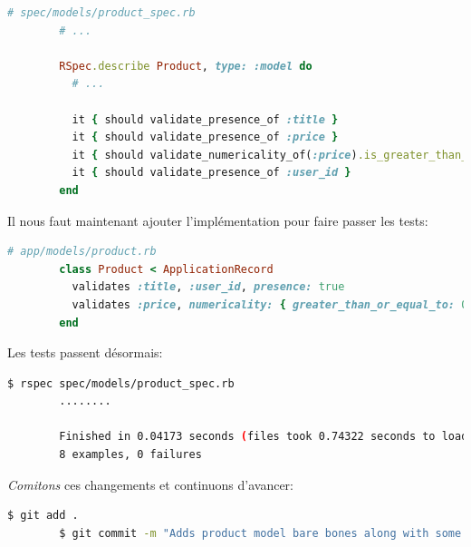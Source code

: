 \documentclass[]{report}
\begin{document}
      \begin{scriptsize}
        \begin{lstlisting}[language=ruby, caption={Ajout de tests de présences pour les produits}, label={lst:add_presence_to_product_test}]
        # spec/models/product_spec.rb
        # ...

        RSpec.describe Product, type: :model do
          # ...

          it { should validate_presence_of :title }
          it { should validate_presence_of :price }
          it { should validate_numericality_of(:price).is_greater_than_or_equal_to(0) }
          it { should validate_presence_of :user_id }
        end
        \end{lstlisting}
      \end{scriptsize}

      Il nous faut maintenant ajouter l'implémentation pour faire passer les tests:

      \begin{scriptsize}
        \begin{lstlisting}[language=ruby]
        # app/models/product.rb
        class Product < ApplicationRecord
          validates :title, :user_id, presence: true
          validates :price, numericality: { greater_than_or_equal_to: 0 }, presence: true
        end
        \end{lstlisting}
      \end{scriptsize}

      Les tests passent désormais:

      \begin{scriptsize}
        \begin{lstlisting}[language=bash]
        $ rspec spec/models/product_spec.rb
        ........

        Finished in 0.04173 seconds (files took 0.74322 seconds to load)
        8 examples, 0 failures
        \end{lstlisting}
      \end{scriptsize}

      \textit{Comitons} ces changements et continuons d'avancer:

      \begin{scriptsize}
        \begin{lstlisting}[language=bash]
        $ git add .
        $ git commit -m "Adds product model bare bones along with some validations"
        \end{lstlisting}
      \end{scriptsize}
\end{document}
